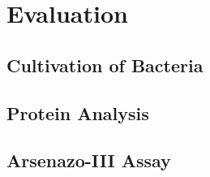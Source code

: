 \chapter{Evaluation}

\section{Cultivation of Bacteria\authorB}

\section{Protein Analysis\authorA}

\section{Arsenazo-III Assay\authorA}

